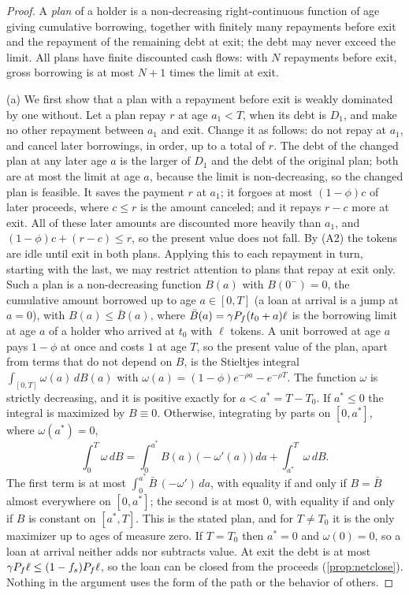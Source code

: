 \begin{proof}
A \emph{plan} of a holder is a non-decreasing right-continuous function of age giving cumulative borrowing, together with finitely many repayments before exit and the repayment of the remaining debt at exit; the debt may never exceed the limit. All plans have finite discounted cash flows: with $N$ repayments before exit, gross borrowing is at most $N+1$ times the limit at exit.

(a) We first show that a plan with a repayment before exit is weakly dominated by one without. Let a plan repay $r$ at age $a_1<T$, when its debt is $D_1$, and make no other repayment between $a_1$ and exit. Change it as follows: do not repay at $a_1$, and cancel later borrowings, in order, up to a total of $r$. The debt of the changed plan at any later age $a$ is the larger of $D_1$ and the debt of the original plan; both are at most the limit at age $a$, because the limit is non-decreasing, so the changed plan is feasible. It saves the payment $r$ at $a_1$; it forgoes at most $(1-\phi)c$ of later proceeds, where $c\le r$ is the amount canceled; and it repays $r-c$ more at exit. All of these later amounts are discounted more heavily than $a_1$, and $(1-\phi)c+(r-c)\le r$, so the present value does not fall. By (A2) the tokens are idle until exit in both plans. Applying this to each repayment in turn, starting with the last, we may restrict attention to plans that repay at exit only. Such a plan is a non-decreasing function $B(a)$ with $B(0^-)=0$, the cumulative amount borrowed up to age $a\in[0,T]$ (a loan at arrival is a jump at $a=0$), with $B(a)\le \bar B(a)$, where $\bar B(a)=\gamma P_f(t_0+a)\ell$ is the borrowing limit at age $a$ of a holder who arrived at $t_0$ with $\ell$ tokens. A unit borrowed at age $a$ pays $1-\phi$ at once and costs $1$ at age $T$, so the present value of the plan, apart from terms that do not depend on $B$, is the Stieltjes integral $\int_{[0,T]} \omega(a)\,dB(a)$ with $\omega(a)=(1-\phi)e^{-\rho a}-e^{-\rho T}$. The function $\omega$ is strictly decreasing, and it is positive exactly for $a<a^\ast=T-T_0$. If $a^\ast\le0$ the integral is maximized by $B\equiv0$. Otherwise, integrating by parts on $[0,a^\ast]$, where $\omega(a^\ast)=0$,
\[
\int_0^{T}\omega\,dB=\int_0^{a^\ast}B(a)\,\bigl(-\omega'(a)\bigr)\,da+\int_{a^\ast}^{T}\omega\,dB .
\]
The first term is at most $\int_0^{a^\ast}\bar B\,(-\omega')\,da$, with equality if and only if $B=\bar B$ almost everywhere on $[0,a^\ast]$; the second is at most $0$, with equality if and only if $B$ is constant on $[a^\ast,T]$. This is the stated plan, and for $T\ne T_0$ it is the only maximizer up to ages of measure zero. If $T=T_0$ then $a^\ast=0$ and $\omega(0)=0$, so a loan at arrival neither adds nor subtracts value. At exit the debt is at most $\gamma P_f\ell\le(1-f_s)P_f\ell$, so the loan can be closed from the proceeds (\cref{prop:netclose}). Nothing in the argument uses the form of the path or the behavior of others.


\end{proof}

